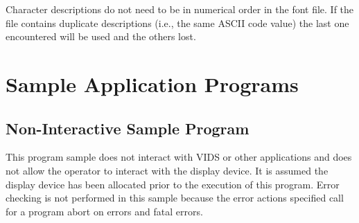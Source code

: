 Character descriptions do not need to be in numerical order
in the font file.  If the file contains duplicate descriptions (i.e.,
the same ASCII code value) the last one encountered will be used and
the others lost.
\cleardoublepage
\section{Sample Application Programs}
\subsection{Non-Interactive Sample Program}
This program sample does not interact with VIDS or other applications
and does not allow the operator to interact with the display device.
It is assumed the display device has been allocated prior to the 
execution of this program.  Error checking is not performed in this
sample because the error actions specified call for a program abort on
errors and fatal errors.
